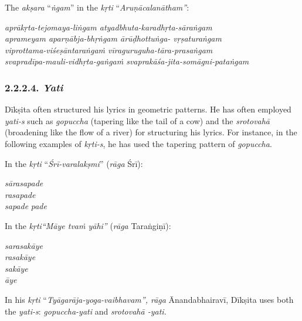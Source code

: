 The \textit{akṣara} “\textit{ṅgam}” in the \textit{kṛti} “\textit{Aruṇācalanātham”}:

\begin{myquote}
\textit{aprākṛta-tejomaya-liṅgam atyadbhuta-karadhṛta-sāraṅgam}\\ \textit{aprameyam aparṇābja-bhṛṅgam ārūḍhottuṅga- vṛṣaturaṅgam}\\ \textit{viprottama-viśeṣāntaraṅgaṁ vīraguruguha-tāra-prasaṅgam}\\ \textit{svapradīpa-mauli-vidhṛta-gaṅgaṁ svaprakāśa-jita-somāgni-pataṅgam}
\end{myquote}


\subsubsection*{2.2.2.4. \textit{Yati}}

Dīkṣita often structured his lyrics in geometric patterns. He has often employed \textit{yati-s} such as \textit{gopuccha} (tapering like the tail of a cow) and the \textit{srotovahā} (broadening like the flow of a river) for structuring his lyrics. For instance, in the following examples of \textit{kṛti-s}, he has used the tapering pattern of \textit{gopuccha}.

\newpage

In the \textit{kṛti} “\textit{Śrī-varalakṣmi}” (\textit{rāga} Śrī):

\begin{myquote}
\textit{sārasapade}\\ \textit{rasapade}\\ \textit{sapade} \textit{pade}
\end{myquote}

In the \textit{kṛti“Māye tvaṁ yāhi”} (\textit{rāga} Taraṅgiṇī):

\begin{myquote}
\textit{sarasakāye}\\ \textit{rasakāye}\\ \textit{sakāye}\\ \textit{āye}
\end{myquote}

In his \textit{kṛti} “\textit{Tyāgarāja-yoga-vaibhavam”, rāga} Ānandabhairavī, Dīkṣita uses both the \textit{yati-s}: \textit{gopuccha-yati} and \textit{srotovahā -yati.}

